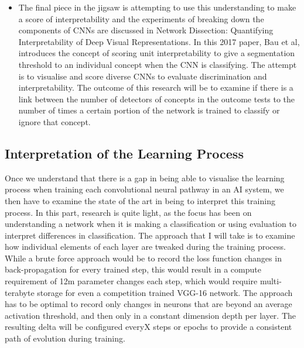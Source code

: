 \begin{itemize}
    \item The final piece in the jigsaw is attempting to use this understanding to make a score of interpretability and the experiments of breaking down the components of CNNs are discussed in Network Dissection: Quantifying Interpretability of Deep Visual Representations. In this 2017 paper, Bau et al, introduces the concept of scoring unit interpretability to give a segmentation threshold to an individual concept when the CNN is classifying. The attempt is to visualise and score diverse CNNs to evaluate discrimination and interpretability. The outcome of this research will be to examine if there is a link between the number of detectors of concepts in the outcome tests to the number of times a certain portion of the network is trained to classify or ignore that concept.

\end{itemize}

\subsection{Interpretation of the Learning Process}

Once we understand that there is a gap in being able to visualise the learning process when training each convolutional neural pathway in an AI system, we then have to examine the state of the art in being to interpret this training process. In this part, research is quite light, as the focus has been on understanding a network when it is making a classification or using evaluation to interpret differences in classification. The approach that I will take is to examine how individual elements of each layer are tweaked during the training process. While a brute force approach would be to record the loss function changes in back-propagation for every trained step, this would result in a compute requirement of 12m parameter changes each step, which would require multi-terabyte storage for even a competition trained VGG-16 network. The approach has to be optimal to record only changes in neurons that are beyond an average activation threshold, and then only in a constant dimension depth per layer. The resulting delta will be configured everyX steps or epochs to provide a consistent path of evolution during training.

